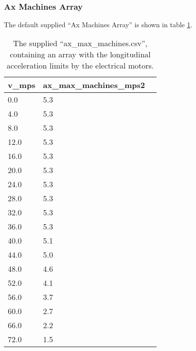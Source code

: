 \subsubsection{Ax Machines Array} \label{sec:Appendix Ax Machines Array}
The default supplied ``Ax Machines Array'' is shown in table \ref{tab:Ax Machines Array}.
\begin{table}[H]
    \centering
    \begin{tabular}{|l|l|l|}
        \hline
        \textbf{v\_mps} & \textbf{ax\_max\_machines\_mps2} \\ \hline
        0.0             & 5.3                              \\ \hline
        4.0             & 5.3                              \\ \hline
        8.0             & 5.3                              \\ \hline
        12.0            & 5.3                              \\ \hline
        16.0            & 5.3                              \\ \hline
        20.0            & 5.3                              \\ \hline
        24.0            & 5.3                              \\ \hline
        28.0            & 5.3                              \\ \hline
        32.0            & 5.3                              \\ \hline
        36.0            & 5.3                              \\ \hline
        40.0            & 5.1                              \\ \hline
        44.0            & 5.0                              \\ \hline
        48.0            & 4.6                              \\ \hline
        52.0            & 4.1                              \\ \hline
        56.0            & 3.7                              \\ \hline
        60.0            & 2.7                              \\ \hline
        66.0            & 2.2                              \\ \hline
        72.0            & 1.5                              \\ \hline
    \end{tabular}
    \caption{The supplied ``ax\_max\_machines.csv'', containing an array with the longitudinal acceleration limits by the electrical motors.}
    \label{tab:Ax Machines Array}
\end{table}


